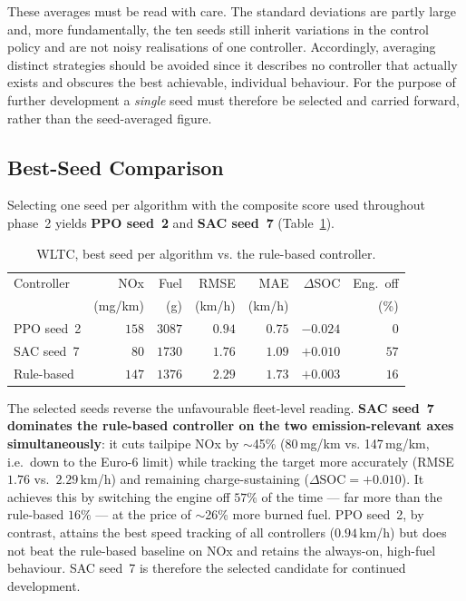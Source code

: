 These averages must be read with care. The standard deviations are partly large and, more fundamentally, the ten seeds still inherit variations in the control policy and are not noisy realisations of one controller. Accordingly, averaging distinct strategies should be avoided since it describes no controller that actually exists and obscures the best achievable, individual behaviour. For the purpose of further development a \emph{single} seed must therefore be selected and carried forward, rather than the seed-averaged figure.

\subsection{Best-Seed Comparison}

Selecting one seed per algorithm with the composite score used throughout phase~2 yields \textbf{PPO seed~2} and \textbf{SAC seed~7}
(Table~\ref{tab:wltc-best}).

\begin{table}[H]
  \centering
  \small
  \begin{tabular}{lrrrrrr}
    \toprule
    Controller & NOx & Fuel & RMSE & MAE & $\Delta$SOC & Eng.\ off \\
    & (mg/km) & (g) & (km/h) & (km/h) & & (\%) \\
    \midrule
    PPO seed~2 & $158$ & $3087$ & $0.94$ & $0.75$ & $-0.024$ & $0$  \\
    SAC seed~7 & $80$  & $1730$ & $1.76$ & $1.09$ & $+0.010$ & $57$ \\
    Rule-based & $147$ & $1376$ & $2.29$ & $1.73$ & $+0.003$ & $16$ \\
    \bottomrule
  \end{tabular}
  \caption[WLTC best-seed comparison]{WLTC, best seed per algorithm vs. the rule-based controller.}
  \label{tab:wltc-best}
\end{table}

The selected seeds reverse the unfavourable fleet-level reading. \textbf{SAC seed~7 dominates the rule-based controller on the two emission-relevant axes simultaneously}: it cuts tailpipe NOx by $\sim$45\% (80\,mg/km vs. 147\,mg/km, i.e.\ down to the Euro-6 limit) while tracking the target more accurately (RMSE $1.76$ vs.\ $2.29$\,km/h) and remaining charge-sustaining ($\Delta\text{SOC}=+0.010$). It achieves this by switching the engine off $57\%$ of the time --- far more than the rule-based $16\%$ --- at the price of $\sim$26\% more burned fuel. PPO seed~2, by contrast, attains the best speed tracking of all controllers ($0.94$\,km/h) but does not beat the rule-based
baseline on NOx and retains the always-on, high-fuel behaviour. SAC seed~7 is therefore the selected candidate for continued development.

